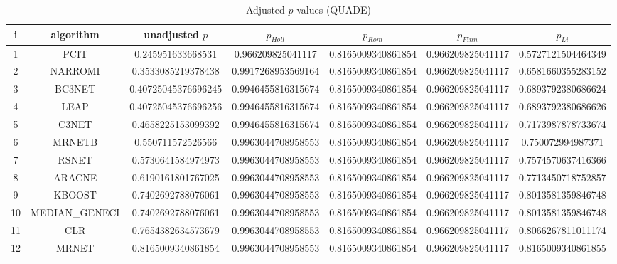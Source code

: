 \documentclass[a4paper,10pt]{article}
\begin{document}
\begin{landscape}
\begin{table}[!htp]
\centering\scriptsize
\caption{Adjusted $p$-values (QUADE)}
\begin{tabular}{ccccccc}
i&algorithm&unadjusted $p$&$p_{Holl}$&$p_{Rom}$&$p_{Finn}$&$p_{Li}$\\
\hline
1&PCIT&0.245951633668531&0.966209825041117&0.8165009340861854&0.966209825041117&0.5727121504464349\\
2&NARROMI&0.3533085219378438&0.9917268953569164&0.8165009340861854&0.966209825041117&0.6581660355283152\\
3&BC3NET&0.40725045376696245&0.9946455816315674&0.8165009340861854&0.966209825041117&0.6893792380686624\\
4&LEAP&0.40725045376696256&0.9946455816315674&0.8165009340861854&0.966209825041117&0.6893792380686626\\
5&C3NET&0.4658225153099392&0.9946455816315674&0.8165009340861854&0.966209825041117&0.7173987878733674\\
6&MRNETB&0.550711572526566&0.9963044708958553&0.8165009340861854&0.966209825041117&0.750072994987371\\
7&RSNET&0.5730641584974973&0.9963044708958553&0.8165009340861854&0.966209825041117&0.7574570637416366\\
8&ARACNE&0.6190161801767025&0.9963044708958553&0.8165009340861854&0.966209825041117&0.7713450718752857\\
9&KBOOST&0.7402692788076061&0.9963044708958553&0.8165009340861854&0.966209825041117&0.8013581359846748\\
10&MEDIAN_GENECI&0.7402692788076061&0.9963044708958553&0.8165009340861854&0.966209825041117&0.8013581359846748\\
11&CLR&0.7654382634573679&0.9963044708958553&0.8165009340861854&0.966209825041117&0.8066267811011174\\
12&MRNET&0.8165009340861854&0.9963044708958553&0.8165009340861854&0.966209825041117&0.8165009340861855\\
\hline
\end{tabular}
\end{table}

\end{landscape}
\end{document}
